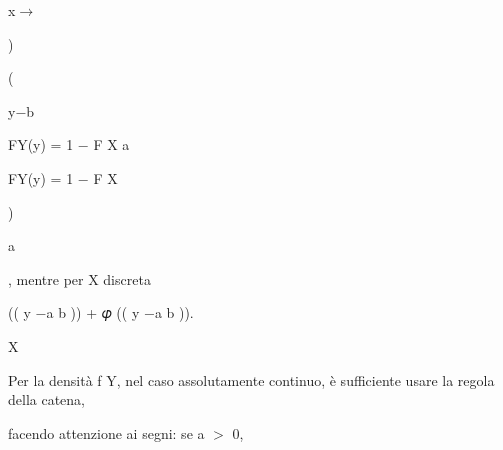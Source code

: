 \documentclass[a4paper,portrait,12pt]{article}
\begin{document}
\begin{flushleft}
x$\rightarrow$
\end{flushleft}





)





(





\begin{flushleft}
y$-$b
\end{flushleft}


\begin{flushleft}
FY(y) = 1 $-$ F X a
\end{flushleft}





\begin{flushleft}
FY(y) = 1 $-$ F X
\end{flushleft}





)





\begin{flushleft}
a
\end{flushleft}





\begin{flushleft}
, mentre per X discreta
\end{flushleft}





\begin{flushleft}
(( y $-$a b )) + 𝜑 (( y $-$a b )).
\end{flushleft}


\begin{flushleft}
X
\end{flushleft}





\begin{flushleft}
Per la densit\`{a} f Y, nel caso assolutamente continuo, \`{e} sufficiente usare la regola della catena,
\end{flushleft}


\begin{flushleft}
facendo attenzione ai segni: se a $>$ 0,
\end{flushleft}
\end{document}
